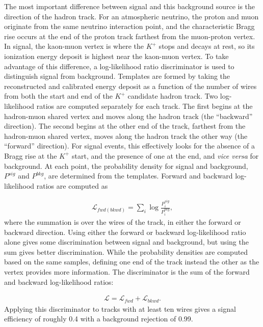 The most important difference between signal and this background source is the direction of the hadron track. For an atmospheric neutrino, the proton and muon originate from the same neutrino interaction point, and the characteristic Bragg rise occurs at the end of the proton track farthest from the muon-proton vertex. In signal, the kaon-muon vertex is where the $K^{+}$ stops and decays at rest, so its ionization energy deposit is highest near the kaon-muon vertex.  To take advantage of this difference, a log-likelihood ratio discriminator is used to distinguish signal from background.  Templates are formed by taking the reconstructed and calibrated energy deposit as a function of the number of wires from both the start and end of the $K^{+}$ candidate hadron track. 
Two log-likelihood ratios are computed separately for each track. The first begins at the hadron-muon shared vertex and moves along the hadron track (the ``backward'' direction). The second begins at the other end of the track, farthest from the hadron-muon shared vertex, moves along the hadron track the other way (the ``forward'' direction). For signal events, this effectively looks for the absence of a Bragg rise at the $K^{+}$ start, and the presence of one at the end, and {\it vice versa} for background.  At each point, the probability density for signal and background, $P^{sig}$ and $P^{bkg}$, are determined from the templates. Forward and backward log-likelihood ratios are computed as

\begin{align}
 \mathcal{L}_{fwd(bkwd)} = \sum_{i} \log\frac{P^{sig}_i}{P^{bkg}_i}, 
\end{align}
where the summation is over the wires of the track, in either the forward or backward direction.  Using either the forward or backward log-likelihood ratio alone gives some discrimination between signal and background, but using the sum gives better discrimination. While the probability densities are computed based on the same samples, defining one end of the track instead the other as the vertex provides more information. The discriminator is the sum of the forward and backward log-likelihood ratios:

\begin{align}
    \mathcal{L} = \mathcal{L}_{fwd} + \mathcal{L}_{bkwd}.\label{eqn:L}
\end{align}
Applying this discriminator to tracks with at least ten wires gives a signal efficiency of roughly \num{0.4} with a background rejection of \num{0.99}.

